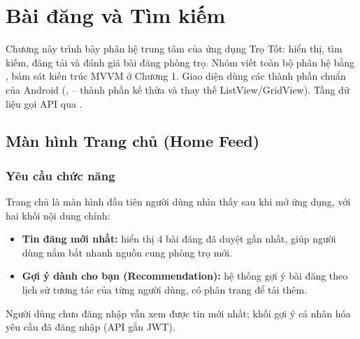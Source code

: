 
\chapter{Bài đăng và Tìm kiếm}

Chương này trình bày phân hệ trung tâm của ứng dụng Trọ Tốt: hiển thị, tìm kiếm,
đăng tải và đánh giá bài đăng phòng trọ. Nhóm viết toàn bộ phân hệ bằng
, bám sát kiến trúc MVVM ở Chương 1. Giao diện dùng các thành phần
chuẩn của Android (,  -- thành phần kế thừa và
thay thế ListView/GridView). Tầng dữ liệu gọi API qua .

\section{Màn hình Trang chủ (Home Feed)}

\subsection{Yêu cầu chức năng}
Trang chủ là màn hình đầu tiên người dùng nhìn thấy sau khi mở ứng dụng, với hai
khối nội dung chính:
\begin{itemize}
    \item \textbf{Tin đăng mới nhất:} hiển thị 4 bài đăng đã duyệt gần nhất,
    giúp người dùng nắm bắt nhanh nguồn cung phòng trọ mới.
    \item \textbf{Gợi ý dành cho bạn (Recommendation):} hệ thống gợi ý bài
    đăng theo lịch sử tương tác của từng người dùng, có phân trang để tải thêm.
\end{itemize}
Người dùng chưa đăng nhập vẫn xem được tin mới nhất; khối gợi ý cá nhân hóa
yêu cầu đã đăng nhập (API gắn JWT).

